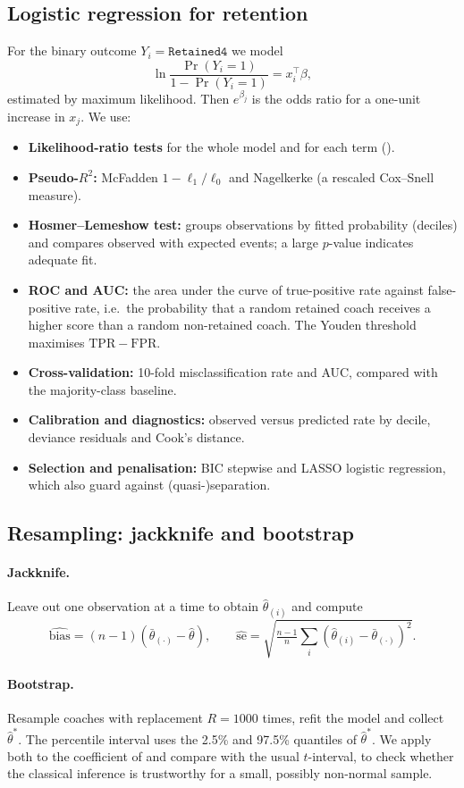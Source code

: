 \documentclass[11pt,a4paper]{article}
\newcommand{\var}[1]{\texttt{\detokenize{#1}}}
\begin{document}
\subsection{Logistic regression for retention}
For the binary outcome $Y_i=\texttt{Retained4}$ we model
\[
\ln\frac{\Pr(Y_i=1)}{1-\Pr(Y_i=1)}=x_i^\top\beta,
\]
estimated by maximum likelihood. Then $e^{\beta_j}$ is the odds ratio for a one-unit increase in $x_j$. We use:
\begin{itemize}
  \item \textbf{Likelihood-ratio tests} for the whole model and for each term (\var{drop1}).
  \item \textbf{Pseudo-$R^2$:} McFadden $1-\ell_1/\ell_0$ and Nagelkerke (a rescaled Cox--Snell measure).
  \item \textbf{Hosmer--Lemeshow test:} groups observations by fitted probability (deciles) and compares observed with expected events; a large $p$-value indicates adequate fit.
  \item \textbf{ROC and AUC:} the area under the curve of true-positive rate against false-positive rate, i.e.\ the probability that a random retained coach receives a higher score than a random non-retained coach. The Youden threshold maximises $\mathrm{TPR}-\mathrm{FPR}$.
  \item \textbf{Cross-validation:} 10-fold misclassification rate and AUC, compared with the majority-class baseline.
  \item \textbf{Calibration and diagnostics:} observed versus predicted rate by decile, deviance residuals and Cook's distance.
  \item \textbf{Selection and penalisation:} BIC stepwise and LASSO logistic regression, which also guard against (quasi-)separation.
\end{itemize}

\subsection{Resampling: jackknife and bootstrap}
\paragraph{Jackknife.} Leave out one observation at a time to obtain $\hat\theta_{(i)}$ and compute
\[
\widehat{\mathrm{bias}}=(n-1)(\bar\theta_{(\cdot)}-\hat\theta),\qquad
\widehat{\mathrm{se}}=\sqrt{\tfrac{n-1}{n}\sum_i(\hat\theta_{(i)}-\bar\theta_{(\cdot)})^2}.
\]
\paragraph{Bootstrap.} Resample coaches with replacement $R=1000$ times, refit the model and collect $\hat\theta^*$. The percentile interval uses the 2.5\% and 97.5\% quantiles of $\hat\theta^*$. We apply both to the coefficient of \var{AllPriorWinPct} and compare with the usual $t$-interval, to check whether the classical inference is trustworthy for a small, possibly non-normal sample.
\end{document}
